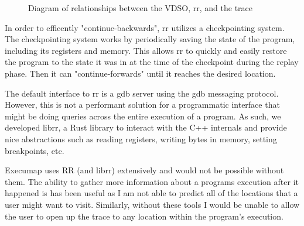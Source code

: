 \begin{figure}
\centering
{}
\caption{Diagram of relationships between the VDSO, rr, and the trace}
\end{figure}


In order to efficently "continue-backwards", rr utilizes a checkpointing system. The checkpointing system works by periodically saving the state of the program, including its registers and memory. This allows rr to quickly and easily restore the program to the state it was in at the time of the checkpoint during the replay phase. Then it can "continue-forwards" until it reaches the desired location.

The default interface to rr is a gdb server using the gdb messaging protocol. However, this is not a performant solution for a programmatic interface that might be doing queries across the entire execution of a program. As such, we developed librr, a Rust library to interact with the C++ internals and provide nice abstractions such as reading registers, writing bytes in memory, setting breakpoints, etc. 

Execumap uses RR (and librr) extensively and would not be possible without them. The ability to gather more information about a programs execution after it happened is has been useful as I am not able to predict all of the locations that a user might want to visit. Similarly, without these tools I would be unable to allow the user to open up the trace to any location within the program's execution.

